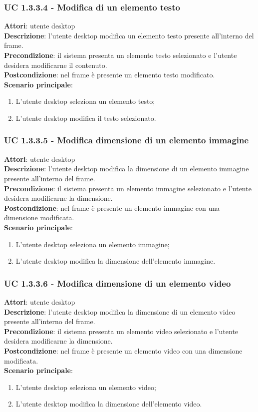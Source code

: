 \subsubsection{UC 1.3.3.4 - Modifica di un elemento testo}{
	\label{uc1.3.3.4}
	\textbf{Attori}: utente desktop \\
	\textbf{Descrizione}: l'utente desktop modifica un elemento testo presente all'interno del frame. \\
	\textbf{Precondizione}: il sistema presenta un elemento testo selezionato e l'utente desidera modificarne il contenuto.	\\
	\textbf{Postcondizione}: nel frame è presente un elemento testo modificato.	\\
	\textbf{Scenario principale}:
	\begin{enumerate}
		\item L'utente desktop seleziona un elemento testo;
		\item L'utente desktop modifica il testo selezionato.
	\end{enumerate}
	}
\subsubsection{UC 1.3.3.5 - Modifica dimensione di un elemento immagine}{
	\label{uc1.3.3.5}
	\textbf{Attori}: utente desktop \\
	\textbf{Descrizione}: l'utente desktop modifica la dimensione di un elemento immagine presente all'interno del frame. \\
	\textbf{Precondizione}: il sistema presenta un elemento immagine selezionato e l'utente desidera modificarne la dimensione.	\\
	\textbf{Postcondizione}: nel frame è presente un elemento immagine con una dimensione modificata.	\\
	\textbf{Scenario principale}:
	\begin{enumerate}
		\item L'utente desktop seleziona un elemento immagine;
		\item L'utente desktop modifica la dimensione dell'elemento immagine.
	\end{enumerate}
	}
\subsubsection{UC 1.3.3.6 - Modifica dimensione di un elemento video}{
	\label{uc1.3.3.6}
	\textbf{Attori}: utente desktop \\
	\textbf{Descrizione}: l'utente desktop modifica la dimensione di un elemento video presente all'interno del frame. \\
	\textbf{Precondizione}: il sistema presenta un elemento video selezionato e l'utente desidera modificarne la dimensione.	\\
	\textbf{Postcondizione}: nel frame è presente un elemento video con una dimensione modificata.	\\
	\textbf{Scenario principale}:
	\begin{enumerate}
		\item L'utente desktop seleziona un elemento video;
		\item L'utente desktop modifica la dimensione dell'elemento video.
	\end{enumerate}
	}
